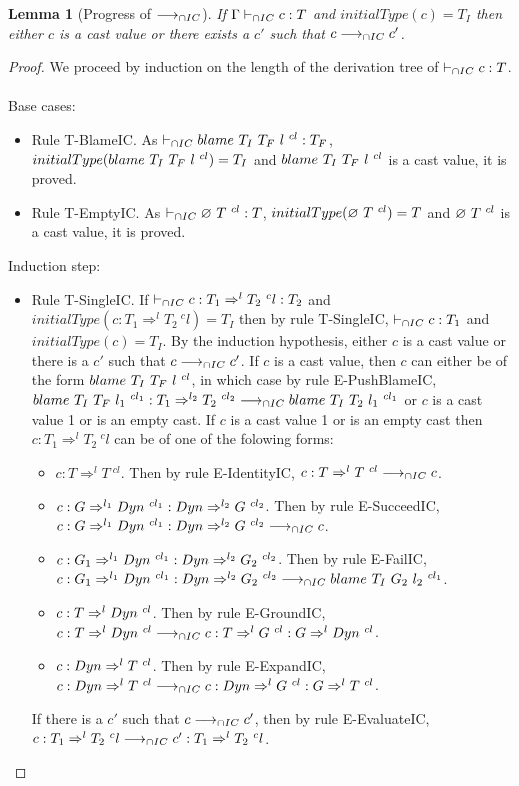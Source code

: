 \documentclass[a4paper]{article}
\newtheorem{lemma}{Lemma}[section]
\begin{document}
\begin{lemma}[Progress of $\longrightarrow_{\cap IC}$]
\label{progressIC}
If $\Gamma \vdash_{\cap IC} c : T$ and $initialType(c) = T_I$ then either $c$ is a cast value or there exists a $c'$ such that $c \longrightarrow_{\cap IC} c'$.
\end{lemma}
\begin{proof}
We proceed by induction on the length of the derivation tree of $\vdash_{\cap IC} c : T$.\\\\
Base cases:
\begin{itemize}
    \item Rule T-BlameIC.
    As $\vdash_{\cap IC} blame\ T_I\ T_F\ l\ ^{cl} : T_F$, $initialType(blame\ T_I\ T_F\ l\ ^{cl}) = T_I$ and $blame\ T_I\ T_F\ l\ ^{cl}$ is a cast value, it is proved.
    \item Rule T-EmptyIC.
    As $\vdash_{\cap IC} \varnothing\ T\ ^{cl} : T$, $initialType(\varnothing\ T\ ^{cl}) = T$ and $\varnothing\ T\ ^{cl}$ is a cast value, it is proved.
\end{itemize}
Induction step:
\begin{itemize}
    \item Rule T-SingleIC.
    If $\vdash_{\cap IC} c : T_1 \Rightarrow^l T_2\ ^cl : T_2$ and $initialType(c : T_1 \Rightarrow^l T_2\ ^cl) = T_I$ then by rule T-SingleIC, $\vdash_{\cap IC} c : T_1$ and $initialType(c) = T_I$.
    By the induction hypothesis, either $c$ is a cast value or there is a $c'$ such that $c \longrightarrow_{\cap IC} c'$.
    If $c$ is a cast value, then $c$ can either be of the form $blame\ T_I\ T_F\ l\ ^{cl}$, in which case by rule E-PushBlameIC, $blame\ T_I\ T_F\ l_1\ ^{cl_1} : T_1 \Rightarrow^{l_2} T_2\ ^{cl_2} \longrightarrow_{\cap IC} blame\ T_I\ T_2\ l_1\ ^{cl_1}$ or $c$ is a cast value 1 or is an empty cast.
    If $c$ is a cast value 1 or is an empty cast then $c : T_1 \Rightarrow^l T_2\ ^cl$ can be of one of the folowing forms:
    \begin{itemize}
        \item $c : T \Rightarrow^l T\ ^{cl}$. Then by rule E-IdentityIC, $c : T \Rightarrow^l T\ ^{cl} \longrightarrow_{\cap IC} c$.
        \item $c : G \Rightarrow^{l_1} Dyn\ ^{cl_1} : Dyn \Rightarrow^{l_2} G\ ^{cl_2}$. Then by rule E-SucceedIC, $c : G \Rightarrow^{l_1} Dyn\ ^{cl_1} : Dyn \Rightarrow^{l_2} G\ ^{cl_2} \longrightarrow_{\cap IC} c$.
        \item $c : G_1 \Rightarrow^{l_1} \Dyn\ ^{cl_1} : \Dyn \Rightarrow^{l_2} G_2\ ^{cl_2}$. Then by rule E-FailIC, $c : G_1 \Rightarrow^{l_1} \Dyn\ ^{cl_1} : \Dyn \Rightarrow^{l_2} G_2\ ^{cl_2} \icos \blamecast{T_I}{G_2}{l_2}{cl_1}$.
        \item $c : T \Rightarrow^l \Dyn\ ^{cl}$. Then by rule E-GroundIC, $c : T \Rightarrow^l Dyn\ ^{cl} \longrightarrow_{\cap IC} c : T \Rightarrow^l G\ ^{cl} : G \Rightarrow^l Dyn\ ^{cl}$.
        \item $c : \Dyn \Rightarrow^l T\ ^{cl}$. Then by rule E-ExpandIC, $c : Dyn \Rightarrow^l T\ ^{cl} \longrightarrow_{\cap IC} c : Dyn \Rightarrow^l G\ ^{cl} : G \Rightarrow^l T\ ^{cl}$.
    \end{itemize}
    If there is a $c'$ such that $c \longrightarrow_{\cap IC} c'$, then by rule E-EvaluateIC, $c : T_1 \Rightarrow^l T_2\ ^cl \longrightarrow_{\cap IC} c' : T_1 \Rightarrow^l T_2\ ^cl$.
\end{itemize}
\end{proof}
\end{document}
